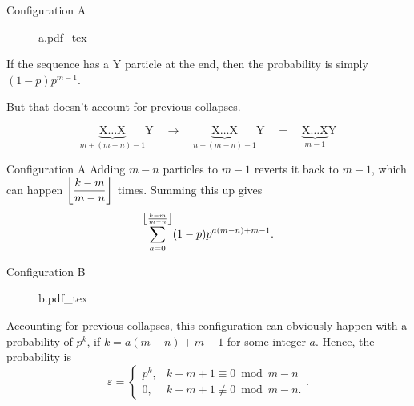 \documentclass[xcolor={usenames,dvipsnames}]{beamer}
\DeclarePairedDelimiter\floor{\lfloor}{\rfloor}
\begin{document}
\begin{frame}{Configuration A}
  \begin{center}
  \begin{figure}[ht]
    \centering
    \def\svgwidth{0.6\textwidth}
    {a.pdf_tex}
  \end{figure}
\end{center}

  If the sequence has a Y particle at the end, then the probability is simply $(1-p)p^{m-1}$.

  But that doesn't account for previous collapses.
  \begin{figure}[H]
      \vspace{-1.5em}
      \begin{equation*}
        \underbrace{\text{X}\dots\text{X}}_{m + (m-n) - 1}\text{Y} \quad \longrightarrow \quad \underbrace{\text{X}\dots\text{X}}_{n+(m-n)-1}\text{Y}\quad = \quad \underbrace{\text{X}\dots\text{X}}_{m-1}\text{Y} 
      \end{equation*}
      \vspace{-2em}
    \end{figure}
  \end{frame}
  \begin{frame}{Configuration A}
    Adding $m-n$ particles to $m-1$ reverts it back to $m-1$, which can happen $\floor*{\dfrac{k-m}{m-n}}$ times. Summing this up gives \[\sum_{a = 0}^{\floor*{\frac{k-m}{m-n}}} (1-p)p^{a(m-n) + m-1}.\]
\end{frame}
\begin{frame}{Configuration B}
    \begin{center}
  \begin{figure}[ht]
    \centering
    \def\svgwidth{0.6\textwidth}
    {b.pdf_tex}
  \end{figure}
\end{center}

  Accounting for previous collapses, this configuration can obviously happen with a probability of $p^{k}$, if $k = a(m-n) + m-1$ for some integer $a$. Hence, the probability is \[
    \varepsilon = \begin{cases} p^{k}, &k-m+1 \equiv 0 \bmod m-n \\ 0, &k-m+1 \not\equiv 0 \bmod m-n. \end{cases}
  .\] 
\end{frame}
\end{document}
